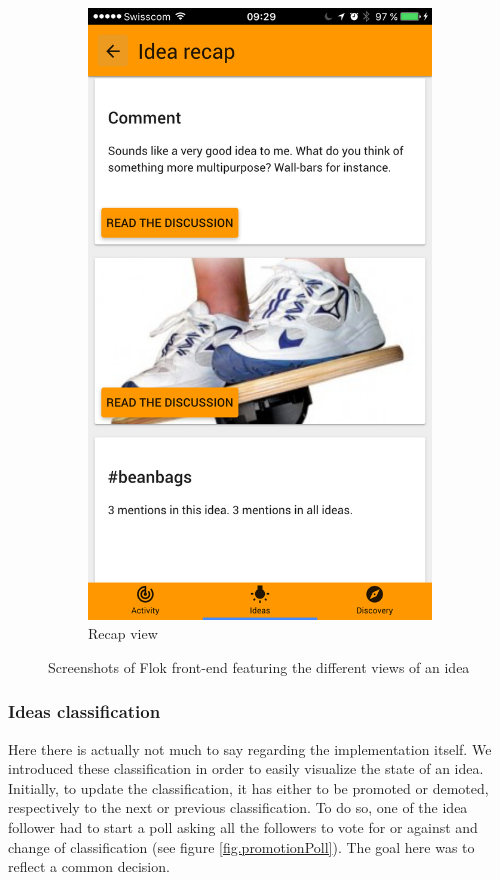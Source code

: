 \documentclass[a4paper,12pt, oneside]{article}
\begin{document}
\begin{figure}[!htb]
\begin{subfigure}[t]{.32\textwidth}
        \includegraphics[width=\textwidth]{images/ideaRecap.png}
        \caption{Recap view}
        \label{fig.idea.recap}
    \end{subfigure}
    \caption{Screenshots of Flok front-end featuring the different views of an idea}
    \label{fig.idea}
\end{figure}

\FloatBarrier
\subsubsection{Ideas classification}
\label{sec.ideasClassification}
Here there is actually not much to say regarding the implementation itself.
We introduced these classification in order to easily visualize the state of an idea.
Initially, to update the classification, it has either to be promoted or demoted, respectively to the next or previous classification.
To do so, one of the idea follower had to start a poll asking all the followers to vote for or against and change of classification (see figure \ref{fig.promotionPoll}).
The goal here was to reflect a common decision.
\end{document}
